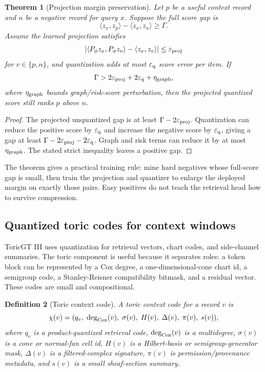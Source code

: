 \documentclass[11pt]{article}
\newtheorem{theorem}{Theorem}[section]
\newtheorem{definition}[theorem]{Definition}
\newcommand{\eps}{\varepsilon}
\numberwithin{equation}{section}
\begin{document}
\begin{theorem}[Projection margin preservation]
Let $p$ be a useful context record and $n$ be a negative record for query $x$. Suppose the full score gap is
\begin{equation}
\langle z_x,z_p\rangle-\langle z_x,z_n\rangle\ge \Gamma.
\end{equation}
Assume the learned projection satisfies
\begin{equation}
|\langle P_\phi z_x,P_\phi z_v\rangle-\langle z_x,z_v\rangle|\le \eps_{\rm proj}
\end{equation}
for $v\in\{p,n\}$, and quantization adds at most $\eps_{\rm q}$ score error per item. If
\begin{equation}
\Gamma>2\eps_{\rm proj}+2\eps_{\rm q}+\eta_{\rm graph},
\end{equation}
where $\eta_{\rm graph}$ bounds graph/risk-score perturbation, then the projected quantized score still ranks $p$ above $n$.
\end{theorem}
\begin{proof}
The projected unquantized gap is at least $\Gamma-2\eps_{\rm proj}$. Quantization can reduce the positive score by $\eps_{\rm q}$ and increase the negative score by $\eps_{\rm q}$, giving a gap at least $\Gamma-2\eps_{\rm proj}-2\eps_{\rm q}$. Graph and risk terms can reduce it by at most $\eta_{\rm graph}$. The stated strict inequality leaves a positive gap.
\end{proof}

The theorem gives a practical training rule: mine hard negatives whose full-score gap is small, then train the projection and quantizer to enlarge the deployed margin on exactly those pairs. Easy positives do not teach the retrieval head how to survive compression.

\subsection{Quantized toric codes for context windows}
ToricGT III uses quantization for retrieval vectors, chart codes, and side-channel summaries. The toric component is useful because it separates roles: a token block can be represented by a Cox degree, a one-dimensional-cone chart id, a semigroup code, a Stanley-Reisner compatibility bitmask, and a residual vector. These codes are small and compositional.

\begin{definition}[Toric context code]
A toric context code for a record $v$ is
\begin{equation}
\chi(v)=(q_v,\;\deg_{\rm Cox}(v),\;\sigma(v),\;H(v),\;\Delta(v),\;\pi(v),\;s(v)),
\end{equation}
where $q_v$ is a product-quantized retrieval code, $\deg_{\rm Cox}(v)$ is a multidegree, $\sigma(v)$ is a cone or normal-fan cell id, $H(v)$ is a Hilbert-basis or semigroup-generator mask, $\Delta(v)$ is a filtered-complex signature, $\pi(v)$ is permission/provenance metadata, and $s(v)$ is a small sheaf-section summary.
\end{definition}
\end{document}

